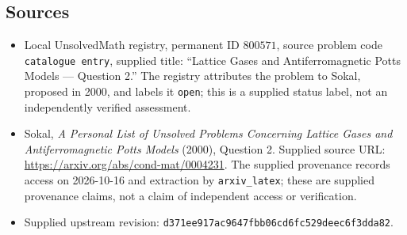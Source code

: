 \documentclass[11pt]{article}
\begin{document}
\subsection{Sources}
\begin{itemize}
\item Local UnsolvedMath registry, permanent ID \(800571\), source problem code \texttt{catalogue entry}, supplied title: ``Lattice Gases and Antiferromagnetic Potts Models — Question 2.'' The registry attributes the problem to Sokal, proposed in 2000, and labels it \texttt{open}; this is a supplied status label, not an independently verified assessment.
\item Sokal, \emph{A Personal List of Unsolved Problems Concerning Lattice Gases and Antiferromagnetic Potts Models} (2000), Question 2. Supplied source URL: \url{https://arxiv.org/abs/cond-mat/0004231}. The supplied provenance records access on 2026-10-16 and extraction by \texttt{arxiv\_latex}; these are supplied provenance claims, not a claim of independent access or verification.
\item Supplied upstream revision: \texttt{d371ee917ac9647fbb06cd6fc529deec6f3dda82}.
\end{itemize}
\end{document}
